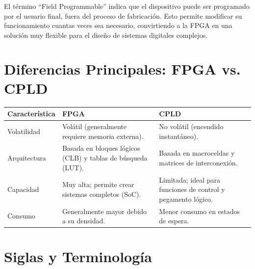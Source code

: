 \documentclass[a4paper,12pt]{article}
\renewcommand{\arraystretch}{1.4}
\begin{document}
	El término ``Field Programmable'' indica que el dispositivo puede ser programado por el usuario final, fuera del proceso de fabricación. Esto permite modificar su funcionamiento cuantas veces sea necesario, convirtiendo a la FPGA en una solución muy flexible para el diseño de sistemas digitales complejos.
	
	\newpage
	\section*{Diferencias Principales: FPGA vs. CPLD}

\begin{table}[h]
	\centering
	\renewcommand{\arraystretch}{1.4}
	\begin{tabularx}{\textwidth}{lXX}
		\toprule
		\textbf{Característica} & \textbf{FPGA} & \textbf{CPLD} \\
		\midrule
		Volatilidad 
		& Volátil (generalmente requiere memoria externa). 
		& No volátil (encendido instantáneo). \\
			\midrule
		Arquitectura 
		& Basada en bloques lógicos (CLB) y tablas de búsqueda (LUT). 
		& Basada en macroceldas y matrices de interconexión. \\
		\midrule
		Capacidad 
		& Muy alta; permite crear sistemas completos (SoC). 
		& Limitada; ideal para funciones de control y pegamento lógico. \\
		\midrule
		Consumo 
		& Generalmente mayor debido a su densidad. 
		& Menor consumo en estados de espera. \\
		\bottomrule
	\end{tabularx}
\end{table}



\section*{Siglas y Terminología}
\end{document}
